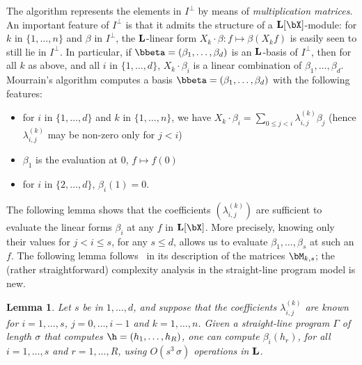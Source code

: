\documentclass[12pt]{article}
\newtheorem{lemma}[definition]{Lemma}
\begin{document}



The algorithm represents the elements in $I^{\perp}$ by means of {\em
  multiplication matrices}. An important feature of $I^{\perp}$ is
that it admits the structure of a $\LL[\bX]$-module: for $k$ in
$\{1,\dots,n\}$ and $\beta$ in $I^{\perp}$, the $\mathbf{L}$-linear form $X_k
\cdot \beta: f \mapsto \beta(X_k f)$ is easily seen to still lie in
$I^{\perp}$.  In particular, if
$\bbeta=(\beta_1,\dots,\beta_d)$ is an $\mathbf{L}$-basis of
$I^{\perp}$, then for all $k$ as above, and all $i$ in
$\{1,\dots,d\}$, $X_k \cdot \beta_i$ is a linear combination of
$\beta_1,\dots,\beta_d$. Mourrain's algorithm computes a basis
$\bbeta=(\beta_1,\dots,\beta_d)$ with the following features:
\begin{itemize}
\item for $i$ in $\{1,\dots,d\}$ and $k$ in $\{1,\dots,n\}$, we have
  $X_k \cdot \beta_i=\sum_{0 \le j < i} \lambda^{(k)}_{i,j} \beta_j$
  (hence $\lambda^{(k)}_{i,j}$ may be non-zero 
  only for $j<i$)
\item $\beta_1$ is the evaluation at $0$, $f \mapsto f(0)$
\item for $i$ in $\{2,\dots,d\}$, $\beta_i(1)=0$.
\end{itemize}
The following lemma shows that the coefficients $(\lambda^{(k)}_{i,j})$
are sufficient to evaluate  the linear forms $\beta_i$ at any $f$ in
$\LL[\bX]$. More precisely, knowing only their values for $j < i \le s$,
for any $s \le d$, allows us to evaluate $\beta_1,\dots,\beta_s$ at such an $f$.
The following lemma follows~\cite{Mourrain97} in its description
of the matrices $\bM_{k,s}$; the (rather straightforward) complexity analysis 
in the straight-line program model is new.
\begin{lemma}\label{lemma:evalbeta}
   Let $s$ be in $1,\dots,d$, and suppose that the coefficients
  $\lambda^{(k)}_{i,j}$ are known for $i=1,\dots,s$, $j=0,\dots,i-1$
  and $k=1,\dots,n$. Given a straight-line program $\Gamma$ of length
  $\sigma$ that computes $\h=(h_1,\dots,h_R)$, one can compute
  $\beta_i(h_r)$, for all $i=1,\dots,s$ and $r=1,\dots,R$, using
  $O(s^3\,\sigma)$ operations in $\mathbf{L}$.
\end{lemma}
\end{document}
